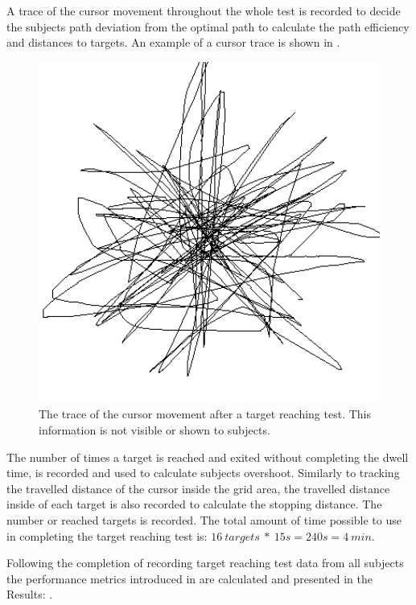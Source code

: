 A trace of the cursor movement throughout the whole test is recorded to decide the subjects path deviation from the optimal path to calculate the path efficiency and distances to targets. An example of a cursor trace is shown in . 

\begin{figure}[H] 
	\includegraphics[width=1\textwidth]{figures/pMethods/cursorTrace}
	\caption{The trace of the cursor movement after a target reaching test. This information is not visible or shown to subjects.}
	\label{fig:cursorTrace}
\end{figure}

The number of times a target is reached and exited without completing the dwell time, is recorded and used to calculate subjects overshoot. Similarly to tracking the travelled distance of the cursor inside the grid area, the travelled distance inside of each target is also recorded to calculate the stopping distance. The number or reached targets is recorded. The total amount of time possible to use in completing the target reaching test is: $16 ~targets~*~15s = 240s = 4~min$. 

Following the completion of recording target reaching test data from all subjects the performance metrics introduced in  are calculated and presented in the Results: .





